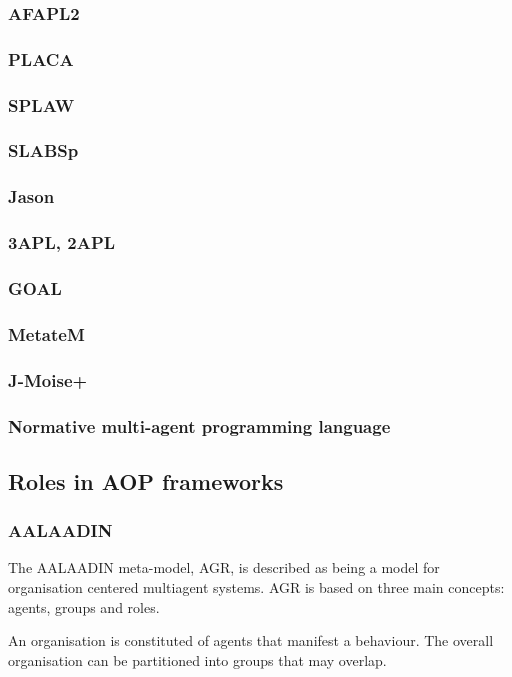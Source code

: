 \documentclass{article}
\begin{document}
\subsubsection{AFAPL2}
\subsubsection{PLACA}
\subsubsection{SPLAW}
\subsubsection{SLABSp}
\subsubsection{Jason}
\subsubsection{3APL, 2APL}
\subsubsection{GOAL}
\subsubsection{MetateM}
\subsubsection{J-Moise+}
\subsubsection{Normative multi-agent programming language}

\subsection{Roles in AOP frameworks}

\subsubsection{AALAADIN} The AALAADIN meta-model, AGR, is described
as being a model for organisation centered multiagent systems.
AGR is based on three main concepts: agents, groups and roles.

An organisation is constituted of agents that manifest a behaviour.
The overall organisation can be partitioned into groups that may
overlap. 
\end{document}
